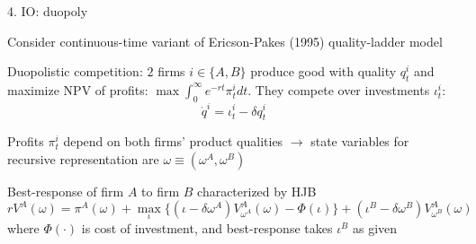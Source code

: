 \documentclass[11pt, aspectratio=169]{beamer}
\newenvironment{witemize}{\itemize\addtolength{\itemsep}{10pt}}{\enditemize}
\begin{document}
\begin{frame}{4. IO: duopoly} 

\begin{witemize}
\item Consider continuous-time variant of Ericson-Pakes (1995) quality-ladder model 

\item Duopolistic competition: $2$ firms $i \in \{A, B\}$ produce good with quality $q_t^i$ and maximize NPV of profits: $\max \int_0^\infty e^{- rt} \pi_t^i dt$. They compete over investments $\iota_t^i$:
\begin{equation*}
	\dot q^i = \iota_t^i - \delta q_t^i
\end{equation*}


\item Profits $\pi_t^i$ depend on both firms' product qualities $\rightarrow$ state variables for recursive representation are $\omega \equiv (\omega^A, \omega^B)$

\item Best-response of firm $A$ to firm $B$ characterized by HJB
\begin{equation*}
	r V^A(\omega) = \pi^A(\omega) + \max_\iota \Big\{ (\iota - \delta \omega^A) V_{\omega^A}^A(\omega) - \Phi(\iota) \Big\} + (\iota^B - \delta \omega^B) V_{\omega^B}^A(\omega) 
\end{equation*}
where $\Phi(\cdot)$ is cost of investment, and best-response takes $\iota^B$ as given
\end{witemize}
\end{frame}
\end{document}
